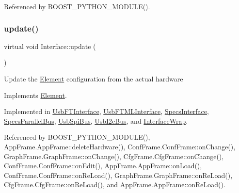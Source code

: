 Referenced by B\+O\+O\+S\+T\+\_\+\+P\+Y\+T\+H\+O\+N\+\_\+\+M\+O\+D\+U\+L\+E().

\mbox{\label{classInterface_a30e71ffbe36091df9f7c0838dd4b60d2}} 
\subsubsection{\texorpdfstring{update()}{update()}}
{\footnotesize\ttfamily virtual void Interface\+::update (\begin{DoxyParamCaption}{ }\end{DoxyParamCaption})\hspace{0.3cm}{\ttfamily [pure virtual]}}

Update the \hyperlink{classElement}{Element} configuration from the actual hardware 

Implements \hyperlink{classElement_a4e6c83efae95616ebddd03c793a26661}{Element}.



Implemented in \hyperlink{classUsbFTInterface_a6adc58a50696c9b3268e84c291901ce7}{Usb\+F\+T\+Interface}, \hyperlink{classUsbFTMLInterface_a941ba5a5c0f398e5d26c97bb4111510d}{Usb\+F\+T\+M\+L\+Interface}, \hyperlink{classSpecsInterface_af17ca5c8d48bea81f84e503b2994f5da}{Specs\+Interface}, \hyperlink{classSpecsParallelBus_ab07e067b62824162d7dc86bfbf4ef096}{Specs\+Parallel\+Bus}, \hyperlink{classUsbSpiBus_a3e26195827351bf88db56dafd1e7de26}{Usb\+Spi\+Bus}, \hyperlink{classUsbI2cBus_a40bd44e6fe19f3e9c52bd4b4e14b80a9}{Usb\+I2c\+Bus}, and \hyperlink{structInterfaceWrap_aee2f0407da52a1de8659b1d83af62238}{Interface\+Wrap}.



Referenced by B\+O\+O\+S\+T\+\_\+\+P\+Y\+T\+H\+O\+N\+\_\+\+M\+O\+D\+U\+L\+E(), App\+Frame.\+App\+Frame\+::delete\+Hardware(), Conf\+Frame.\+Conf\+Frame\+::on\+Change(), Graph\+Frame.\+Graph\+Frame\+::on\+Change(), Cfg\+Frame.\+Cfg\+Frame\+::on\+Change(), Conf\+Frame.\+Conf\+Frame\+::on\+Edit(), App\+Frame.\+App\+Frame\+::on\+Load(), Conf\+Frame.\+Conf\+Frame\+::on\+Re\+Load(), Graph\+Frame.\+Graph\+Frame\+::on\+Re\+Load(), Cfg\+Frame.\+Cfg\+Frame\+::on\+Re\+Load(), and App\+Frame.\+App\+Frame\+::on\+Re\+Load().

\mbox{\label{classInterface_ad665cacbaf490a26c1c4ba192022e68a}} 

